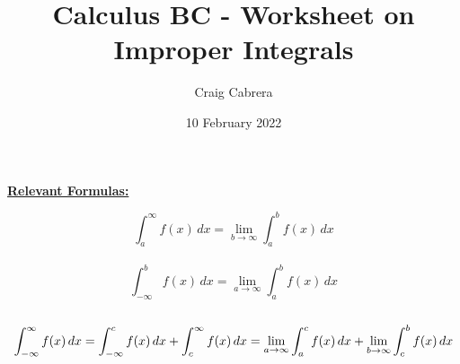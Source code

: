 \documentclass[10pt, letterpaper]{report}
\title{Calculus BC - Worksheet on Improper Integrals}
\author{Craig Cabrera}
\date{10 February 2022}
\begin{document}
\maketitle
\begin{center}
  \textbf{\underline{Relevant Formulas:}}
\end{center}

$$ \int_{a}^{\infty}{f(x)}\,dx=\lim_{b\to\infty}\int_{a}^{b}{f(x)}\,dx$$ \\

$$ \int_{-\infty}^{b}{f(x)}\,dx=\lim_{a\to\infty}\int_{a}^{b}{f(x)}\,dx$$ \\

$$ \int_{-\infty}^{\infty}{f(x)}\,dx=\int_{-\infty}^{c}{f(x)}\,dx+\int_{c}^{\infty}{f(x)}\,dx=\lim_{a\to\-\infty}\int_{a}^{c}{f(x)}\,dx+\lim_{b\to\infty}\int_{c}^{b}{f(x)}\,dx $$
\pagebreak
\end{document}
